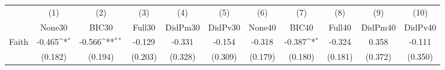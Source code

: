 {
\def\sym#1{\ifmmode^{#1}\else\(^{#1}\)\fi}
\begin{tabular}{l*{10}{c}}
\toprule
            &\multicolumn{1}{c}{(1)}&\multicolumn{1}{c}{(2)}&\multicolumn{1}{c}{(3)}&\multicolumn{1}{c}{(4)}&\multicolumn{1}{c}{(5)}&\multicolumn{1}{c}{(6)}&\multicolumn{1}{c}{(7)}&\multicolumn{1}{c}{(8)}&\multicolumn{1}{c}{(9)}&\multicolumn{1}{c}{(10)}\\
            &\multicolumn{1}{c}{None30}&\multicolumn{1}{c}{BIC30}&\multicolumn{1}{c}{Full30}&\multicolumn{1}{c}{DidPm30}&\multicolumn{1}{c}{DidPv30}&\multicolumn{1}{c}{None40}&\multicolumn{1}{c}{BIC40}&\multicolumn{1}{c}{Full40}&\multicolumn{1}{c}{DidPm40}&\multicolumn{1}{c}{DidPv40}\\
\midrule
Faith       &      -0.465\sym{*}  &      -0.566\sym{**} &      -0.129         &      -0.331         &      -0.154         &      -0.318         &      -0.387\sym{*}  &      -0.324         &       0.358         &      -0.111         \\
            &     (0.182)         &     (0.194)         &     (0.203)         &     (0.328)         &     (0.309)         &     (0.179)         &     (0.180)         &     (0.181)         &     (0.372)         &     (0.350)         \\
\bottomrule
\end{tabular}
}
